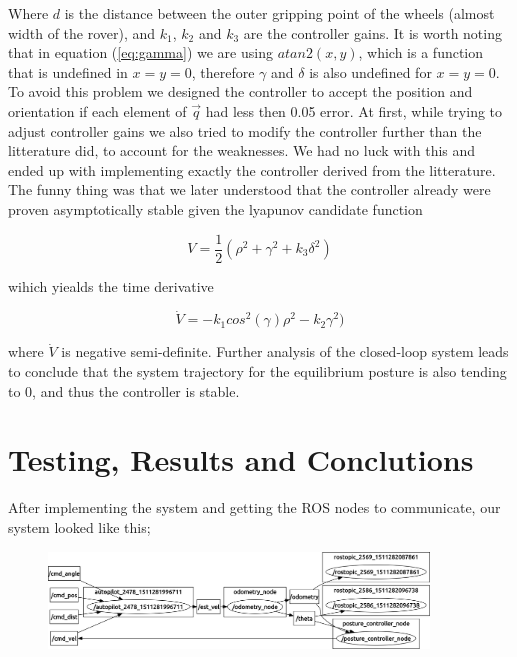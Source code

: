 \documentclass[a4paper,10pt]{article}
\begin{document}
		Where $d$ is the distance between the outer gripping point of the wheels (almost width of the rover), and $k_{1}$, $k_{2}$ and $k_{3}$ are the controller gains.
		It is worth noting that in equation (\ref{eq:gamma}) we are using $atan2(x,y)$, which is a function that is undefined in $x=y=0$, therefore $\gamma$ and $\delta$ is also undefined for $x=y=0$.
		To avoid this problem we designed the controller to accept the position and orientation if each element of $\vec{q}$ had less then 0.05 error. At first, while trying to adjust controller gains 
		we also tried to modify the controller further than the litterature did, to account for the weaknesses. We had no luck with this and ended up with implementing exactly the controller
		derived from the litterature. The funny thing was that we later understood that the controller already were proven asymptotically stable given the lyapunov candidate function

		\begin{equation}
			V = \frac{1}{2}(\rho^2 + \gamma^2 + k_{3}\delta^2)
		\end{equation}

		wihich yiealds the time derivative

		\begin{equation}
			\dot{V} = - k_{1}cos^2(\gamma)\rho^2 - k_{2}\gamma^2)
		\end{equation}

		where $\dot{V}$ is negative semi-definite. Further analysis of the closed-loop system leads to conclude that the system trajectory for the equilibrium posture is also tending to 0, 
		and thus the controller is stable.


\section{Testing, Results and Conclutions}

		After implementing the system and getting the ROS nodes to communicate, our system looked like this;

		\begin{figure}[H]
		\centering
		\includegraphics[width=0.9\textwidth]{rover2_rqt_graph.png}
 		\label{fig:rqtgraph}
		\end{figure}
\end{document}
